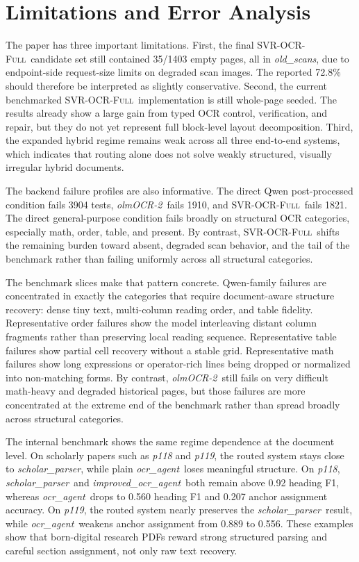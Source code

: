 \documentclass[conference]{IEEEtran}
\newcommand{\papername}[1]{\textit{#1}}
\newcommand{\scholar}{\papername{scholar\_parser}}
\newcommand{\ocragent}{\papername{ocr\_agent}}
\newcommand{\improvedocr}{\papername{improved\_ocr\_agent}}
\newcommand{\svrocr}{\textsc{SVR-OCR-Full}}
\newcommand{\olmocr}{\papername{olmOCR-2}}
\begin{document}
\section{Limitations and Error Analysis}

The paper has three important limitations. First, the final \svrocr\ candidate set still contained 35/1403 empty pages, all in \papername{old\_scans}, due to endpoint-side request-size limits on degraded scan images. The reported 72.8\% should therefore be interpreted as slightly conservative. Second, the current benchmarked \svrocr\ implementation is still whole-page seeded. The results already show a large gain from typed OCR control, verification, and repair, but they do not yet represent full block-level layout decomposition. Third, the expanded hybrid regime remains weak across all three end-to-end systems, which indicates that routing alone does not solve weakly structured, visually irregular hybrid documents.

The backend failure profiles are also informative. The direct Qwen post-processed condition fails 3904 tests, \olmocr\ fails 1910, and \svrocr\ fails 1821. The direct general-purpose condition fails broadly on structural OCR categories, especially math, order, table, and present. By contrast, \svrocr\ shifts the remaining burden toward absent, degraded scan behavior, and the tail of the benchmark rather than failing uniformly across all structural categories.

The benchmark slices make that pattern concrete. Qwen-family failures are concentrated in exactly the categories that require document-aware structure recovery: dense tiny text, multi-column reading order, and table fidelity. Representative order failures show the model interleaving distant column fragments rather than preserving local reading sequence. Representative table failures show partial cell recovery without a stable grid. Representative math failures show long expressions or operator-rich lines being dropped or normalized into non-matching forms. By contrast, \olmocr\ still fails on very difficult math-heavy and degraded historical pages, but those failures are more concentrated at the extreme end of the benchmark rather than spread broadly across structural categories.

The internal benchmark shows the same regime dependence at the document level. On scholarly papers such as \papername{p118} and \papername{p119}, the routed system stays close to \scholar, while plain \ocragent\ loses meaningful structure. On \papername{p118}, \scholar\ and \improvedocr\ both remain above 0.92 heading F1, whereas \ocragent\ drops to 0.560 heading F1 and 0.207 anchor assignment accuracy. On \papername{p119}, the routed system nearly preserves the \scholar\ result, while \ocragent\ weakens anchor assignment from 0.889 to 0.556. These examples show that born-digital research PDFs reward strong structured parsing and careful section assignment, not only raw text recovery.
\end{document}
